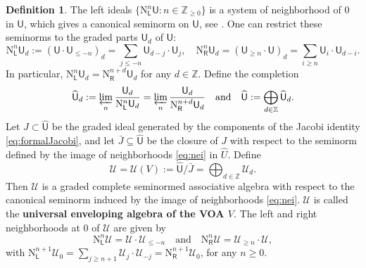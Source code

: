 \documentclass[12pt,a4paper,reqno]{amsart}
\numberwithin{equation}{section}
\numberwithin{equation}{section}
\theoremstyle{definition}
\newtheorem{df}[thm]{Definition}
\newcommand{\Z}{\mathbb{Z}}
\def \ra {\rightarrow}
\def \ssq{\subseteq}
\def\L{\mathcal{L}}
\def\spn{\mathrm{span}}
\def\Om{\Omega}
\def\scrU{\mathscr{U}}
\def\rN{\mathrm{N}}
\def\L{\mathsf{L}}
\def\U{\mathsf{U}}
\def\rN{\mathrm{N}}
\def\L{\mathsf{L}}
\def\sR{\mathsf{R}}
\def\U{\mathsf{U}}
\begin{document}
\begin{df}
	The left ideals $\{\rN^n_\L \U:n\in \Z_{\geq 0}\}$ is a system of neighborhood of $0$ in $\U$, which gives a canonical seminorm on $\U$, see \cite[Definition A.6.1]{DGK23}. One can restrict these seminorms to the graded parts $\U_d$ of $\U$: 
	\begin{equation}\label{eq:completion}
		\rN^n_\L \U_d:=(\U\cdot \U_{\leq -n})_d=\sum_{j\leq -n} \U_{d-j}\cdot \U_j,\quad  	\rN^n_\sR \U_d=(\U_{\geq n}\cdot \U)_d=\sum_{i\geq n} \U_i\cdot \U_{d-i}.
	\end{equation}
	In particular, $\rN^n_\L \U_d=\rN^{n+d}_\sR \U_d$ for any $d\in \Z$. Define the completion
	$$
	\widehat{\U}_d:=\varprojlim_n\frac{\U_d}{\rN^n_\L \U_d}=\varprojlim_n\frac{\U_d}{\rN^{n+d}_\sR \U_d}\quad \mathrm{and}\quad \widehat{\U}:=\bigoplus_{d\in \Z} \widehat{\U}_d. 
	$$ 
	Let $J\subset \widehat{\U}$ be the graded ideal generated by the components of the Jacobi identity \eqref{eq:formalJacobi}, and let $\bar{J}\ssq \widehat{\U}$ be the closure of $J$ with respect to the seminorm defined by the image of neighborhoods \eqref{eq:nei} in $\widehat{U}$. Define
	$$\scrU=\scrU(V):=\widehat{\U}/\bar{J}=\bigoplus_{d\in \Z} \scrU_d.$$
	Then $\scrU$ is a graded complete seminormed associative algebra with respect to the canonical seminorm induced by the image of neighborhoods \eqref{eq:nei}. $\scrU$ is called the {\bf universal enveloping algebra of the VOA $V$}. The left and right neighborhoods at $0$ of $\scrU$  are given by 
	\begin{equation}\label{eq:nebors}
		\rN^n_\L \scrU=\scrU\cdot \scrU_{\leq -n}\quad \mathrm{and}\quad  	\rN^n_\sR \scrU=\scrU_{\geq n}\cdot \scrU,
	\end{equation}
	with $	\rN^{n+1}_\L \scrU_0=\sum_{j \geq n+1} \scrU_j\cdot \scrU_{-j}=	\rN^{n+1}_\sR \scrU_0$, for any $n\geq 0$.
\end{df} 


	
\end{document}
